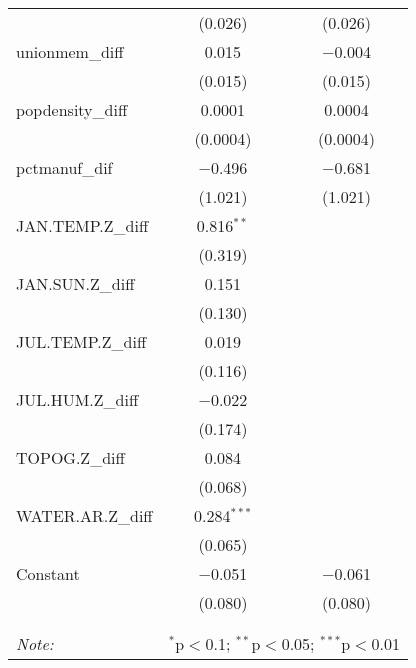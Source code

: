 \begin{table}[!htbp]
\begin{tabular}{@{\extracolsep{5pt}}lcc}
  & (0.026) & (0.026) \\ 
  unionmem\_diff & 0.015 & $-$0.004 \\ 
  & (0.015) & (0.015) \\ 
  popdensity\_diff & 0.0001 & 0.0004 \\ 
  & (0.0004) & (0.0004) \\ 
  pctmanuf\_dif & $-$0.496 & $-$0.681 \\ 
  & (1.021) & (1.021) \\ 
  JAN.TEMP.Z\_diff & 0.816$^{**}$ &  \\ 
  & (0.319) &  \\ 
  JAN.SUN.Z\_diff & 0.151 &  \\ 
  & (0.130) &  \\ 
  JUL.TEMP.Z\_diff & 0.019 &  \\ 
  & (0.116) &  \\ 
  JUL.HUM.Z\_diff & $-$0.022 &  \\ 
  & (0.174) &  \\ 
  TOPOG.Z\_diff & 0.084 &  \\ 
  & (0.068) &  \\ 
  WATER.AR.Z\_diff & 0.284$^{***}$ &  \\ 
  & (0.065) &  \\ 
  Constant & $-$0.051 & $-$0.061 \\ 
  & (0.080) & (0.080) \\ 
 \hline \\[-1.8ex] 
\hline 
\hline \\[-1.8ex] 
\textit{Note:}  & \multicolumn{2}{r}{$^{*}$p$<$0.1; $^{**}$p$<$0.05; $^{***}$p$<$0.01} \\ 
\end{tabular} 
\end{table} 
